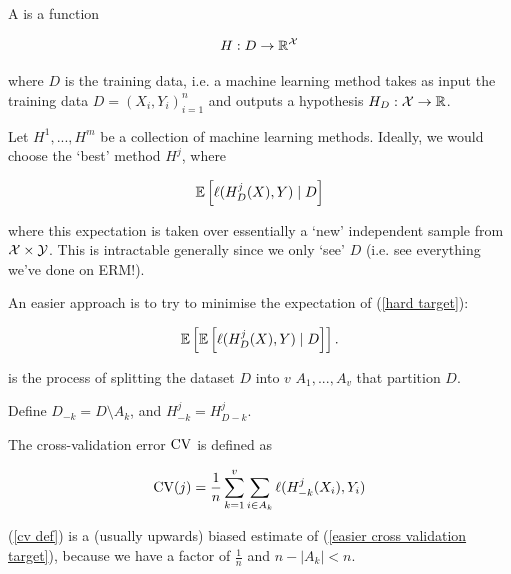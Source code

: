 \documentclass[11pt]{scrartcl}
\begin{document}
\begin{definition}
A  is a function

\begin{equation}
    H : D \rightarrow \mathbb R^{\mathcal{X}}
\end{equation}

where $D$ is the training data, i.e. a machine learning method takes as input the training data $D = (X_i, Y_i)_{i=1}^n$ and outputs a hypothesis $H_D : \mathcal{X} \rightarrow \mathbb R$.
\end{definition}

Let $H^1, ... , H^m$ be a collection of machine learning methods. Ideally, we would choose the `best' method $H^j$, where

\begin{equation}
    \mathbb{E} \left[  \ell (H_D^j(X), Y) \mid D  \right]
\label{hard target}
\end{equation}

where this expectation is taken over essentially a `new' independent sample from $\mathcal{X} \times \mathcal{Y}$. This is intractable generally since we only `see' $D$ (i.e. see everything we've done on ERM!).

An easier approach is to try to minimise the expectation of (\ref{hard target}):

\begin{equation}
    \mathbb{E} \left[  \mathbb{E} \left[  \ell (H_D^j(X), Y) \mid D  \right]  \right].
\label{easier cross validation target}
\end{equation}

\begin{definition}
 is the process of splitting the dataset $D$ into $v$  $A_1, ... , A_v$ that partition $D$.

Define $D_{-k} = D \setminus A_k$, and $H_{-k}^j=H_{D-k}^j$.
\end{definition}

\begin{definition}
The cross-validation error $\text{CV}$ is defined as

\begin{equation}
    \text{CV}(j) = \frac1n \sum_{k=1}^v \sum_{i \in A_k} \ell(H^j_{-k}(X_i), Y_i)
\end{equation}
\label{cv def}
\end{definition}

\begin{remark}
(\ref{cv def}) is a (usually upwards) biased estimate of (\ref{easier cross validation target}), because we have a factor of $\frac1n$ and $n - |A_k| < n$.
\end{remark}
\end{document}
